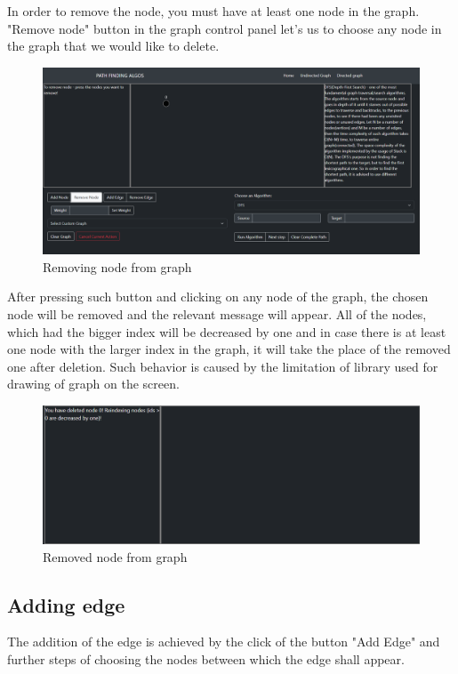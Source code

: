 In order to remove the node, you must have at least one node in the graph. "Remove node" button in the graph control panel let's us to choose any node in the graph that we would like to delete.

\begin{figure}[H]
	\centering
	\includegraphics[width=\textwidth]{images/removing_node.png}
	\caption{Removing node from graph}
\end{figure}

After pressing such button and clicking on any node of the graph, the chosen node will be removed and the relevant message will appear. All of the nodes, which had the bigger index will be decreased by one and in case there is at least one node with the larger index in the graph, it will take the place of the removed one after deletion. Such behavior is caused by the limitation of library used for drawing of graph on the screen.

\begin{figure}[H]
	\centering
	\includegraphics[width=\textwidth]{images/removed_node.png}
	\caption{Removed node from graph}
\end{figure}

\subsection{Adding edge}

The addition of the edge is achieved by the click of the button "Add Edge" and further steps of choosing the nodes between which the edge shall appear. 

